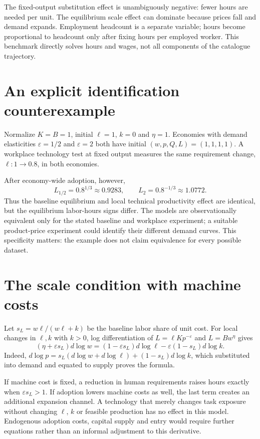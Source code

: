 \documentclass[11pt]{article}
\begin{document}
The fixed-output substitution effect is unambiguously negative: fewer hours are needed per unit. The equilibrium scale effect can dominate because prices fall and demand expands. Employment headcount is a separate variable; hours become proportional to headcount only after fixing hours per employed worker. This benchmark directly solves hours and wages, not all components of the catalogue trajectory.

\section*{An explicit identification counterexample}
Normalize $K=B=1$, initial $\ell=1$, $k=0$ and $\eta=1$. Economies with demand elasticities $\varepsilon=1/2$ and $\varepsilon=2$ both have initial $(w,p,Q,L)=(1,1,1,1)$. A workplace technology test at fixed output measures the same requirement change, $\ell:1\to0.8$, in both economies.

After economy-wide adoption, however,
\[
 L_{1/2}=0.8^{1/3}\approx0.9283,\qquad
 L_2=0.8^{-1/3}\approx1.0772.
\]
Thus the baseline equilibrium and local technical productivity effect are identical, but the equilibrium labor-hours signs differ. The models are observationally equivalent only for the stated baseline and workplace experiment; a suitable product-price experiment could identify their different demand curves. This specificity matters: the example does not claim equivalence for every possible dataset.

\section*{The scale condition with machine costs}
Let $s_L=w\ell/(w\ell+k)$ be the baseline labor share of unit cost. For local changes in $\ell,k$ with $k>0$, log differentiation of $L=\ell Kp^{-\varepsilon}$ and $L=Bw^\eta$ gives
\[
 (\eta+\varepsilon s_L)d\log w
 =(1-\varepsilon s_L)d\log\ell
   -\varepsilon(1-s_L)d\log k.
\]
Indeed, $d\log p=s_L(d\log w+d\log\ell)+(1-s_L)d\log k$, which substituted into demand and equated to supply proves the formula.

If machine cost is fixed, a reduction in human requirements raises hours exactly when $\varepsilon s_L>1$. If adoption lowers machine costs as well, the last term creates an additional expansion channel. A technology that merely changes task exposure without changing $\ell$, $k$ or feasible production has no effect in this model. Endogenous adoption costs, capital supply and entry would require further equations rather than an informal adjustment to this derivative.
\end{document}
